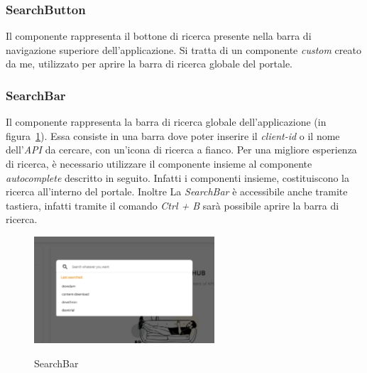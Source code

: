 \subsubsection{SearchButton}\label{subsubsec:search-button}
Il componente rappresenta il bottone di ricerca presente nella barra di navigazione superiore dell'applicazione.
Si tratta di un componente \textit{custom} creato da me, utilizzato per aprire la barra di ricerca globale del portale. 

\subsubsection{SearchBar}\label{subsubsec:search-bar}
Il componente rappresenta la barra di ricerca globale dell'applicazione (in figura~\ref{fig:search-bar}). 
Essa consiste in una barra dove poter inserire il \textit{client-id} o il nome dell'\textit{API} da cercare,
con un'icona di ricerca a fianco. Per una migliore esperienza di ricerca, è necessario utilizzare il componente insieme al componente \textit{autocomplete} descritto in seguito.
Infatti i componenti insieme, costituiscono la ricerca all'interno del portale. Inoltre La \textit{SearchBar} è accessibile anche tramite tastiera,
infatti tramite il comando \textit{Ctrl + B} sarà possibile aprire la barra di ricerca.\\

\begin{figure}[ht]
  \centering
  \includegraphics[width=0.6\textwidth, alt={Barra di ricerca globale dell'applicazione}]{images/frontend/SearchBar.jpg}
  \caption{SearchBar}\label{fig:search-bar}
\end{figure}
\pagebreak


